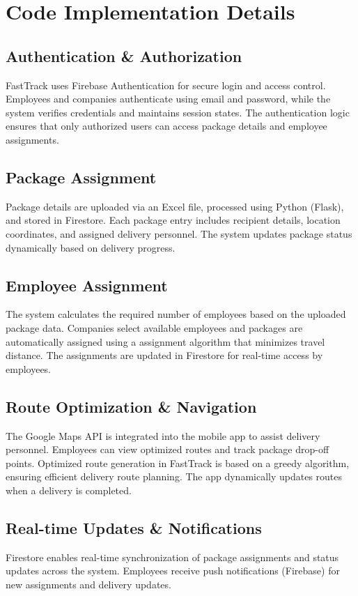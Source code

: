 \section{Code Implementation Details}
\subsection{Authentication \& Authorization}
FastTrack uses Firebase Authentication for secure login and access control. Employees and companies authenticate using email and password, while the system verifies credentials and maintains session states. The authentication logic ensures that only authorized users can access package details and employee assignments.
\subsection{Package Assignment}
Package details are uploaded via an Excel file, processed using Python (Flask), and stored in Firestore. Each package entry includes recipient details, location coordinates, and assigned delivery personnel. The system updates package status dynamically based on delivery progress.
\subsection{Employee Assignment}
The system calculates the required number of employees based on the uploaded package data. Companies select available employees and packages are automatically assigned using a assignment algorithm that minimizes travel distance. The assignments are updated in Firestore for real-time access by employees.
\subsection{Route Optimization \& Navigation}
The Google Maps API is integrated into the mobile app to assist delivery personnel. Employees can view optimized routes and track package drop-off points.
Optimized route generation in FastTrack is based on a greedy algorithm, ensuring efficient delivery route planning. The app dynamically updates routes when a delivery is completed.
\subsection{Real-time Updates \& Notifications}
Firestore enables real-time synchronization of package assignments and status updates across the system. Employees receive push notifications (Firebase) for new assignments and delivery updates.
